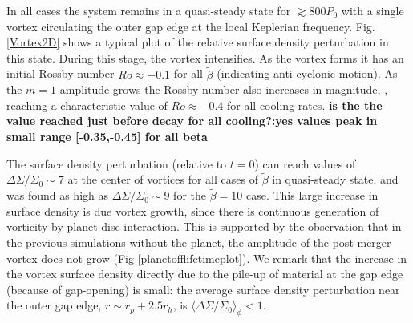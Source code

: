 In all cases the system remains in a quasi-steady state for
$\gtrsim800P_0$ with a single vortex circulating 
the outer gap edge at the local Keplerian  
frequency. Fig. \ref{Vortex2D} shows a typical plot of the relative 
surface density perturbation in this state. During this stage, the 
vortex intensifies. As the vortex forms it has an initial 
Rossby number $Ro\approx-0.1$ for all $\tilde\beta$
(indicating anti-cyclonic
motion). As the $m=1$ amplitude grows the Rossby number also increases
in magnitude, 
, reaching a characteristic value of $Ro\approx-0.4$ for all cooling
rates. {\bf is the the value reached just before decay for all cooling?:yes 
values peak in small range [-0.35,-0.45] for all beta}

The surface density perturbation (relative to $t=0$)  
can reach values of $\Delta\Sigma/\Sigma_0 \sim 7$ at the center of vortices
for all cases of $\tilde\beta$ in quasi-steady state, and
was found as high as $\Delta\Sigma/\Sigma_0 \sim 9$ for the 
$\tilde\beta=10$ case. This large increase in surface density is due 
vortex growth, since there is continuous generation of vorticity by
planet-disc interaction. This is supported by the observation that in
the previous simulations without the planet, the amplitude of
the post-merger vortex does not grow (Fig
\ref{planetofflifetimeplot}).  We remark that the increase in the
vortex surface density directly due to the pile-up of material at the
gap edge (because of gap-opening) is small: the average surface density
perturbation near the outer gap edge, $r\sim r_{p}+2.5r_h$, is 
$\langle\Delta\Sigma/\Sigma_0\rangle_\phi<1$.  




